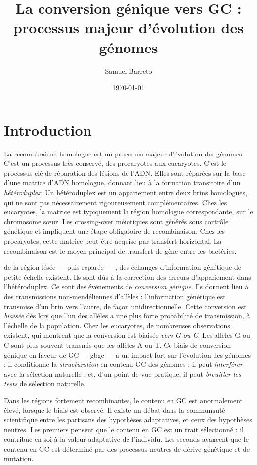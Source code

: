 \documentclass[11pt, oneside]{scrartcl}
\author{Samuel Barreto}
\date{\today}
\title{La conversion génique vers GC : processus majeur d'évolution des génomes}
\begin{document}


\section{Introduction}
\label{sec:orgheadline1}

La recombinaison homologue est un processus majeur d'évolution des génomes.
C'est un processus très conservé, des procaryotes aux eucaryotes. C'est le
processus clé de réparation des lésions de l'ADN. Elles sont réparées sur la
base d'une matrice d'ADN homologue, donnant lieu à la formation transitoire d'un
\emph{hétéroduplex}. Un hétéroduplex est un appariement entre deux brins homologues,
qui ne sont pas nécessairement rigoureusement complémentaires. Chez les
eucaryotes, la matrice est typiquement la région homologue correspondante, sur
le chromosome sœur. Les crossing-over méiotiques sont générés sous contrôle
génétique et impliquent une étape obligatoire de recombinaison. Chez les
procaryotes, cette matrice peut être acquise par transfert horizontal. La
recombinaison est le moyen principal de transfert de gène entre les bactéries.

 de la région lésée --- puis réparée --- , des échanges
d'information génétique de petite échelle existent. Ils sont dûs à la correction
des erreurs d'appariement dans l'hétéroduplex. Ce sont des événements de
\emph{conversion génique}. Ils donnent lieu à des transmissions non-mendéliennes
d'allèles : l'information génétique est transmise d'un brin vers l'autre, de
façon unidirectionnelle. Cette conversion est \emph{biaisée} dès lors que l'un des
allèles a une plus forte probabilité de transmission, à l'échelle de la
population. Chez les eucaryotes, de nombreuses observations existent, qui
montrent que la conversion est biaisée \emph{vers G ou C}. Les allèles G ou C sont
plus souvent transmis que les allèles A ou T. Ce biais de conversion génique en
faveur de GC --- \ac{gbgc} --- a un impact fort sur l'évolution des génomes : il
conditionne la \emph{structuration} en contenu GC des génomes ; il peut \emph{interférer}
avec la sélection naturelle ; et, d'un point de vue pratique, il peut \emph{brouiller
les tests} de sélection naturelle.

Dans les régions fortement recombinantes, le contenu en GC est anormalement
élevé, lorsque le biais est observé. Il existe un débat dans la communauté
scientifique entre les partisans des hypothèses adaptatives, et ceux des
hypothèses neutres. Les premiers pensent que le contenu en GC est un trait
sélectionné : il contribue en soi à la valeur adaptative de l'individu. Les
seconds avancent que le contenu en GC est déterminé par des processus neutres de
dérive génétique et de mutation.
\end{document}

